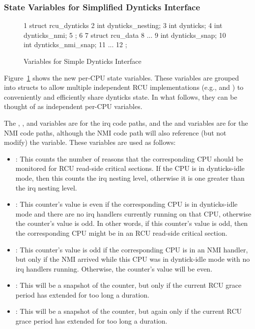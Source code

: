 \subsubsection{State Variables for Simplified Dynticks Interface}
\label{sec:formal:State Variables for Simplified Dynticks Interface}

\begin{figure}[tbp]
{ \scriptsize
\begin{verbbox}
  1 struct rcu_dynticks {
  2   int dynticks_nesting;
  3   int dynticks;
  4   int dynticks_nmi;
  5 };
  6
  7 struct rcu_data {
  8   ...
  9   int dynticks_snap;
 10   int dynticks_nmi_snap;
 11   ...
 12 };
\end{verbbox}
}
\centering
\theverbbox
\caption{Variables for Simple Dynticks Interface}
\label{fig:formal:Variables for Simple Dynticks Interface}
\end{figure}

Figure~\ref{fig:formal:Variables for Simple Dynticks Interface}
shows the new per-CPU state variables.
These variables are grouped into structs to allow multiple independent
RCU implementations (e.g.,  and ) to conveniently
and efficiently share dynticks state.
In what follows, they can be thought of as independent per-CPU variables.

The , , and  variables
are for the irq code paths, and the  and
 variables are for the NMI code paths, although
the NMI code path will also reference (but not modify) the
 variable.
These variables are used as follows:

\begin{itemize}
\item	{}:
	This counts the number of reasons that the corresponding
	CPU should be monitored for RCU read-side critical sections.
	If the CPU is in dynticks-idle mode, then this counts the
	irq nesting level, otherwise it is one greater than the
	irq nesting level.
\item	{}:
	This counter's value is even if the corresponding CPU is
	in dynticks-idle mode and there are no irq handlers currently
	running on that CPU, otherwise the counter's value is odd.
	In other words, if this counter's value is odd, then the
	corresponding CPU might be in an RCU read-side critical section.
\item	{}:
	This counter's value is odd if the corresponding CPU is
	in an NMI handler, but only if the NMI arrived while this
	CPU was in dyntick-idle mode with no irq handlers running.
	Otherwise, the counter's value will be even.
\item	{}:
	This will be a snapshot of the  counter, but
	only if the current RCU grace period has extended for too
	long a duration.
\item	{}:
	This will be a snapshot of the  counter, but
	again only if the current RCU grace period has extended for too
	long a duration.
\end{itemize}

